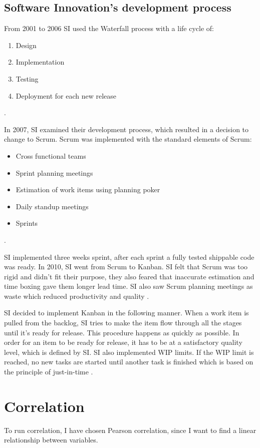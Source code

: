 \documentclass[UKenglish]{ifimaster}  %
\begin{document}
\subsection{Software Innovation's development process}
From 2001 to 2006 SI used the Waterfall process with a life cycle of:
\begin{enumerate}[noitemsep,topsep=0pt,parsep=0pt,partopsep=0pt]
\item Design
\item Implementation 
\item Testing
\item Deployment for each new release
\end{enumerate} 
\parencite{Dag}. 

In 2007, SI examined their development process, which resulted in a decision to change to Scrum. Scrum was implemented with the standard elements of Scrum:
\begin{itemize}[noitemsep,topsep=0pt,parsep=0pt,partopsep=0pt]
\item Cross functional teams
\item Sprint planning meetings 
\item Estimation of work items using planning poker
\item Daily standup meetings
\item Sprints
\end{itemize}
\parencite{Dag}. 

SI implemented three weeks sprint, after each sprint a fully tested shippable code was ready. In 2010, SI went from Scrum to Kanban. SI felt that Scrum was too rigid and didn't fit their purpose, they also feared that inaccurate estimation and time boxing gave them longer lead time. SI also saw Scrum planning meetings as waste which reduced productivity and quality \parencite{Dag}. 

SI decided to implement Kanban in the following manner. When a work item is pulled from the backlog, SI tries to make the item flow through all the stages until it's ready for release. This procedure happens as quickly as possible. In order for an item to be ready for release, it has to be at a satisfactory quality level, which is defined by SI. SI also implemented WIP limits. If the WIP limit is reached, no new tasks are started until another task is finished which is based on the principle of just-in-time \parencite{Dag}.

\section{Correlation}
To run correlation, I have chosen Pearson correlation, since I want to find a linear relationship between variables. 
\end{document}
